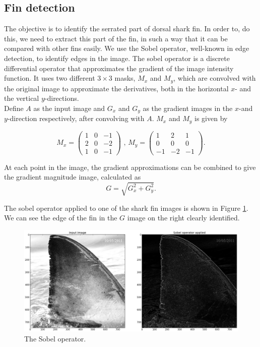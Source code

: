 \documentclass[a4paper,10pt]{article}
\begin{document}
\subsection{Fin detection}
The objective is to identify the serrated part of dorsal shark fin. In order
to, do this, we need to extract this part of the fin, in such a way that it can be 
compared with other fins easily.
We use the
Sobel operator,
well-known in edge detection, to identify edges in the image.
The sobel operator is a discrete differential operator that approximates the
gradient of the image intensity function.  It uses two different $3 \times 3$
masks, $M_x$ and $M_y$, which are convolved with the original image to
approximate the
derivatives, both in the horizontal $x$-
and the vertical $y$-directions.  \\

Define $A$ as the input image and $G_x$ and $G_y$ as the gradient images in the
$x$-and $y$-direction respectively,
after convolving with $A$.  $M_x$ and $M_y$ is given by

\[
 M_x = \begin{pmatrix*}
        1 & 0 & -1 \\
        2 & 0 & -2 \\
        1 & 0 & -1
       \end{pmatrix*}
\mbox{ , }
 M_y = \begin{pmatrix*}
        1 & 2 & 1 \\
        0 & 0 & 0 \\
        -1 & -2 & -1
       \end{pmatrix*}
.\]

At each point in the image, the gradient approximations can be combined to give
the gradient magnitude image, calculated  as
\[
 G = \sqrt{G_x^2+G_y^2}
.\]

The sobel operator applied to one of the shark fin images is shown in Figure 
\ref{sobel}.
We can see the edge of the fin in the $G$ image on the right clearly
identified.

\begin{figure}[H]
 \centering
 \includegraphics[width=5in]{sobel.jpg}
 \caption{The Sobel operator.}
 \label{sobel}
\end{figure}
\end{document}
